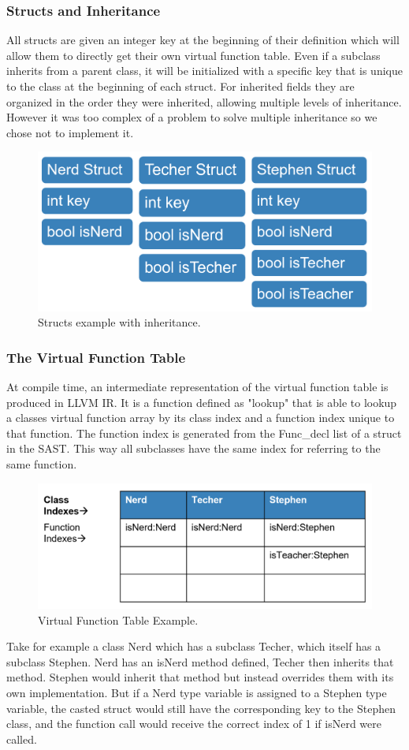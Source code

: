 \begin{homeworkProblem}
    \subsubsection{Structs and Inheritance}
    All structs are given an integer key at the beginning of their definition which will allow them to directly get their own virtual function table. Even if a subclass inherits from a parent class, it will be initialized with a specific key that is unique to the class at the beginning of each struct. For inherited fields they are organized in the order they were inherited, allowing multiple levels of inheritance. However it was too complex of a problem to solve multiple inheritance so we chose not to implement it. 
    \begin{figure}[!ht]
    	\centering
    	\includegraphics[width=4.5in]{Includes/structs}
    	\caption{Structs example with inheritance.}
    \end{figure}
    \pagebreak
    \subsubsection{The Virtual Function Table}
	At compile time, an intermediate representation of the virtual function table is produced in LLVM IR. It is a function defined as "lookup" that is able to lookup a classes virtual function array by its class index and a function index unique to that function. The function index is generated from the Func\_decl list of a struct in the SAST. This way all subclasses have the same index for referring to the same function.
	\begin{figure}[!ht]
		\centering
		\includegraphics[width=4.5in]{Includes/vft}
		\caption{Virtual Function Table Example.}
	\end{figure}
	Take for example a class Nerd which has a subclass Techer, which itself has a subclass Stephen. Nerd has an isNerd method defined, Techer then inherits that method. Stephen would inherit that method but instead overrides them with its own implementation. But if a Nerd type variable is assigned to a Stephen type variable, the casted struct would still have the corresponding key to the Stephen class, and the function call would receive the correct index of 1 if isNerd were called. 

\end{homeworkProblem}
